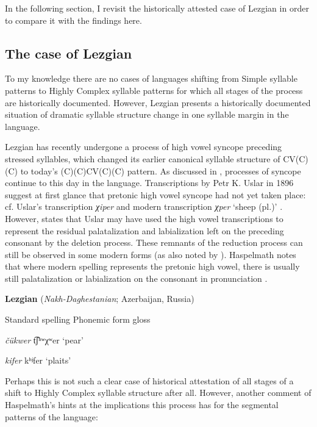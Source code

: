   In the following section, I revisit the historically attested case of Lezgian in order to compare it with the findings here.

\subsection{The case of Lezgian}\label{sec:8.4.4}

  To my knowledge there are no cases of languages shifting from Simple syllable patterns to Highly Complex syllable patterns for which all stages of the process are historically documented. However, Lezgian presents a historically documented situation of dramatic syllable structure change in one syllable margin in the language.

  Lezgian has recently undergone a process of high vowel syncope preceding stressed syllables, which changed its earlier canonical syllable structure of CV(C)(C) to today’s (C)(C)CV(C)(C) pattern. As discussed in , processes of syncope continue to this day in the language. Transcriptions by Petr K. Uslar in 1896 suggest at first glance that pretonic high vowel syncope had not yet taken place: cf. Uslar’s transcription \textit{χiper} and modern transcription \textit{χper} ‘sheep (pl.)’ \citep[36]{Haspelmath1993}. However, \citet[56]{Haspelmath1993} states that Uslar may have used the high vowel transcriptions to represent the residual palatalization and labialization left on the preceding consonant by the deletion process. These remnants of the reduction process can still be observed in some modern forms (as also noted by \citealt{ChitoranBabaliyeva2007}). Haspelmath notes that where modern spelling represents the pretonic high vowel, there is usually still palatalization or labialization on the consonant in pronunciation .

\ea\label{ex:(8.3)}
  \textbf{Lezgian} (\textit{Nakh-Daghestanian}; Azerbaijan, Russia)

Standard spelling  Phonemic form  gloss

\textit{čükwer}      t͡ʃʰʷχʷer    ‘pear’

\textit{kifer}      kʰʲfer       ‘plaits’

\citep[37]{Haspelmath1993}

\z

Perhaps this is not such a clear case of historical attestation of all stages of a shift to Highly Complex syllable structure after all. However, another comment of Haspelmath’s hints at the implications this process has for the segmental patterns of the language:

